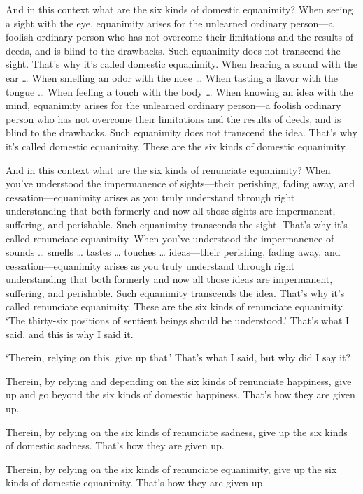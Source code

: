 \documentclass[12pt,openany]{book}%
\begin{document}
And in this context what are the six kinds of domestic equanimity? When seeing a sight with the eye, equanimity arises for the unlearned ordinary person—a foolish ordinary person who has not overcome their limitations and the results of deeds, and is blind to the drawbacks. Such equanimity does not transcend the sight. That’s why it’s called domestic equanimity. When hearing a sound with the ear … When smelling an odor with the nose … When tasting a flavor with the tongue … When feeling a touch with the body … When knowing an idea with the mind, equanimity arises for the unlearned ordinary person—a foolish ordinary person who has not overcome their limitations and the results of deeds, and is blind to the drawbacks. Such equanimity does not transcend the idea. That’s why it’s called domestic equanimity. These are the six kinds of domestic equanimity. 

And in this context what are the six kinds of renunciate equanimity? When you’ve understood the impermanence of sights—their perishing, fading away, and cessation—equanimity arises as you truly understand through right understanding that both formerly and now all those sights are impermanent, suffering, and perishable. Such equanimity transcends the sight. That’s why it’s called renunciate equanimity. When you’ve understood the impermanence of sounds … smells … tastes … touches … ideas—their perishing, fading away, and cessation—equanimity arises as you truly understand through right understanding that both formerly and now all those ideas are impermanent, suffering, and perishable. Such equanimity transcends the idea. That’s why it’s called renunciate equanimity. These are the six kinds of renunciate equanimity. ‘The thirty-six positions of sentient beings should be understood.’ That’s what I said, and this is why I said it. 

‘Therein, relying on this, give up that.’ That’s what I said, but why did I say it? 

Therein, by relying and depending on the six kinds of renunciate happiness, give up and go beyond the six kinds of domestic happiness. That’s how they are given up. 

Therein, by relying on the six kinds of renunciate sadness, give up the six kinds of domestic sadness. That’s how they are given up. 

Therein, by relying on the six kinds of renunciate equanimity, give up the six kinds of domestic equanimity. That’s how they are given up. 
\end{document}
